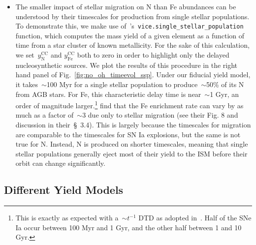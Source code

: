 \documentclass[ms.tex]{subfiles}
\begin{document}
\begin{itemize}
	\item The smaller impact of stellar migration on N than Fe abundances can 
	be understood by their timescales for production from single stellar 
	populations. 
	To demonstrate this, we make use 
	of~\vice's~\texttt{vice.single\_stellar\_population} function, which 
	computes the mass yield of a given element as a function of time from a 
	star cluster of known metallicity. 
	For the sake of this calculation, we set~$y_\text{N}^\text{CC}$ and 
	$y_\text{Fe}^\text{CC}$ both to zero in order to highlight only the delayed 
	nucleosynthetic sources. 
	We plot the results of this procedure in the right hand panel of 
	Fig.~\ref{fig:no_oh_timeevol_ssp}. 
	Under our fiducial yield model, it takes~$\sim$100 Myr for a single stellar 
	population to produce~$\sim$50\% of its N from AGB stars. 
	For Fe, this characteristic delay time is near~$\sim$1 Gyr, an order of 
	magnitude larger.\footnote{
		This is exactly as expected with a~$\sim t^{-1}$ DTD as adopted 
		in~\citet{Johnson2021}. 
		Half of the SNe Ia occur between 100 Myr and 1 Gyr, and the other half 
		between 1 and 10 Gyr. 
	} 
	\citet{Johnson2021} find that the Fe enrichment rate can vary by as much 
	as a factor of~$\sim$3 due only to stellar migration (see their Fig. 8 and 
	discussion in their~\S~3.4). 
	This is largely because the timescales for migration are comparable to the 
	timescales for SN Ia explosions, but the same is not true for N. 
	Instead, N is produced on shorter timescales, meaning that single stellar 
	populations generally eject most of their yield to the ISM before their 
	orbit can change significantly. 
\end{itemize} 

\subsection{Different Yield Models} 
\label{sec:results:yields} 
\end{document}
